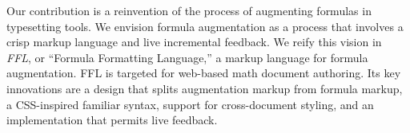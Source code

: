 Our contribution is a reinvention of the process of augmenting formulas in typesetting tools. We envision formula augmentation as a process that involves a crisp markup language and live incremental feedback. We reify this vision in \emph{FFL}, or ``Formula Formatting Language,'' a markup language for formula augmentation. FFL is targeted for web-based math document authoring. Its key innovations are a design that splits augmentation markup from formula markup, a CSS-inspired familiar syntax, support for cross-document styling, and an implementation that permits live feedback.







